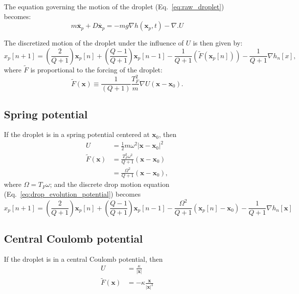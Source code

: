 \documentclass{article}
\newcommand{\x}{\mathbf{x}}
\begin{document}
The equation governing the motion of the droplet (Eq.~\ref{eq:raw_droplet}) becomes:
\begin{equation}
    \label{eq:raw_droplet_potential}
	m \ddot{\x_p} + D \dot{\x_p} = - m g \nabla h(\x_p,t) - \nabla .U
\end{equation}

The discretized motion of the droplet under the influence of $U$ is then given by:
\begin{equation}
	x_p[n+1] = \left( \frac{2}{Q+1} \right) \x_p[n] + \left( \frac{Q-1}{Q+1} \right) \x_p[n-1] - \frac{1}{Q+1} (\tilde{F}(\x_p[n])) - \frac{1}{Q+1} \nabla h_{n}[x]\label{eq:drop_evolution_potential},
\end{equation}
where $\tilde{F}$ is proportional to the forcing of the droplet:
\begin{equation}
  \label{eq:forcing_def}
  \tilde{F}(\x) \equiv \frac{1}{(Q+1)} \frac{T_{F}^2}{m} \nabla U(\x - \x_{0}).
\end{equation}



\subsection{Spring potential}
If the droplet is in a spring potential centered at $\x_0$, then 
\begin{align}
  U &= \frac{1}{2}m \omega^2 \left| \x - \x_0 \right|^2 \label{eq:spring_potential} \\
  \tilde{F}(\x) &= \frac{T_{F}^2 \omega^2}{Q+1} (\x - \x_0) \label{eq:_spring_forcing_} \\
     &= \frac{\Omega^2}{Q+1} (\x - \x_0), \label{eq:spring_forcing}
\end{align}
where $\Omega = T_{F} \omega$; and the discrete drop motion equation (Eq.~\ref{eq:drop_evolution_potential}) becomes
\begin{equation}
  x_p[n+1] = \left( \frac{2}{Q+1} \right) \x_p[n] + \left( \frac{Q-1}{Q+1} \right) \x_p[n-1] - \frac{\Omega^2}{Q+1} (\x_p[n] - \x_0) - \frac{1}{Q+1} \nabla h_{n}[\x] \label{eq:drop_motion_spring} 
\end{equation}


\subsection{Central Coulomb potential}
If the droplet is in a central Coulomb potential, then
\begin{align}
  U &= \frac{\kappa}{|\x|} \label{eq:coulomb_potential} \\
  \tilde{F}(\x) &= - \kappa \frac{\x}{|\x|^3} 
\end{align}
\end{document}

